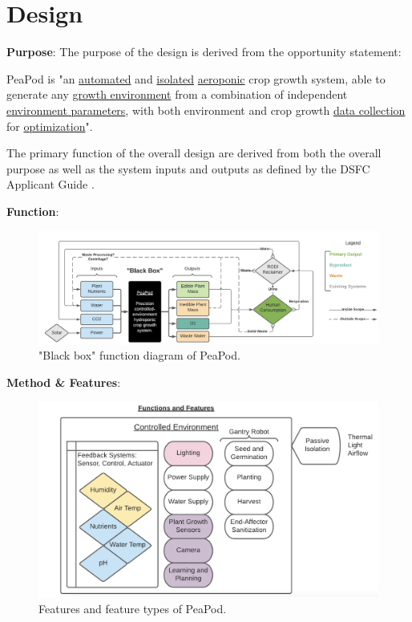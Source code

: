 \documentclass{report}
\begin{document}
\newpage

\section{Design}

\textbf{Purpose}: The purpose of the design is derived from the opportunity statement:

PeaPod is "an \uline{automated} and \uline{isolated} \uline{aeroponic} crop growth system, able to generate any \uline{growth environment} from a combination of independent \uline{environment parameters}, with both environment and crop growth \uline{data collection} for \uline{optimization}".

The primary function of the overall design are derived from both the overall purpose as well as the system inputs and outputs as defined by the DSFC Applicant Guide \cite{applicantguide}.

\textbf{Function}:

\begin{figure}[h]
    \centering
    \includegraphics[width=15cm]{images/blackbox.png}
    \hfill
    \caption{"Black box" function diagram of PeaPod.}
\end{figure}

\textbf{Method \& Features}: 

\begin{figure}[h]
    \centering
    \includegraphics[width=12cm]{images/features.png}
    \hfill
    \caption{Features and feature types of PeaPod.}
\end{figure}
\end{document}
